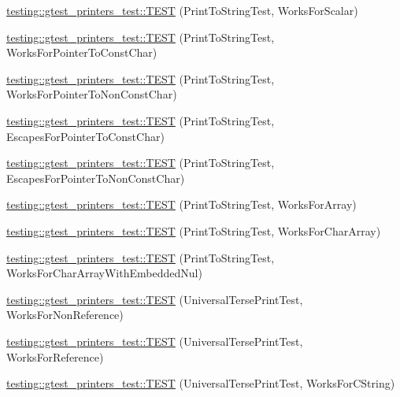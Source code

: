 \begin{DoxyCompactItemize}
\hyperlink{namespacetesting_1_1gtest__printers__test_a5d1bc4b12c18ccaec2ced9f45c092567}{testing\+::gtest\+\_\+printers\+\_\+test\+::\+T\+E\+S\+T} (Print\+To\+String\+Test, Works\+For\+Scalar)
\item 
\hyperlink{namespacetesting_1_1gtest__printers__test_a68100148758516ebab9c761ca7778586}{testing\+::gtest\+\_\+printers\+\_\+test\+::\+T\+E\+S\+T} (Print\+To\+String\+Test, Works\+For\+Pointer\+To\+Const\+Char)
\item 
\hyperlink{namespacetesting_1_1gtest__printers__test_a1db34d8760c17157572ce2877007d15a}{testing\+::gtest\+\_\+printers\+\_\+test\+::\+T\+E\+S\+T} (Print\+To\+String\+Test, Works\+For\+Pointer\+To\+Non\+Const\+Char)
\item 
\hyperlink{namespacetesting_1_1gtest__printers__test_ab8fce4287e837cfcd851ded56b62f9ce}{testing\+::gtest\+\_\+printers\+\_\+test\+::\+T\+E\+S\+T} (Print\+To\+String\+Test, Escapes\+For\+Pointer\+To\+Const\+Char)
\item 
\hyperlink{namespacetesting_1_1gtest__printers__test_a7203081ef422f0835643d2c54b8ebf28}{testing\+::gtest\+\_\+printers\+\_\+test\+::\+T\+E\+S\+T} (Print\+To\+String\+Test, Escapes\+For\+Pointer\+To\+Non\+Const\+Char)
\item 
\hyperlink{namespacetesting_1_1gtest__printers__test_a78bd89af8a8505880b78ec2a001d3cb8}{testing\+::gtest\+\_\+printers\+\_\+test\+::\+T\+E\+S\+T} (Print\+To\+String\+Test, Works\+For\+Array)
\item 
\hyperlink{namespacetesting_1_1gtest__printers__test_ad122dc21e7ebad023d7048ef117a1129}{testing\+::gtest\+\_\+printers\+\_\+test\+::\+T\+E\+S\+T} (Print\+To\+String\+Test, Works\+For\+Char\+Array)
\item 
\hyperlink{namespacetesting_1_1gtest__printers__test_a65e208358dddc7747f4519410c71d877}{testing\+::gtest\+\_\+printers\+\_\+test\+::\+T\+E\+S\+T} (Print\+To\+String\+Test, Works\+For\+Char\+Array\+With\+Embedded\+Nul)
\item 
\hyperlink{namespacetesting_1_1gtest__printers__test_ab49ff6527b0b01411b725fe46e1af65c}{testing\+::gtest\+\_\+printers\+\_\+test\+::\+T\+E\+S\+T} (Universal\+Terse\+Print\+Test, Works\+For\+Non\+Reference)
\item 
\hyperlink{namespacetesting_1_1gtest__printers__test_ab7adb58a0e08e0830157a5a1c7bceac5}{testing\+::gtest\+\_\+printers\+\_\+test\+::\+T\+E\+S\+T} (Universal\+Terse\+Print\+Test, Works\+For\+Reference)
\item 
\hyperlink{namespacetesting_1_1gtest__printers__test_ab11252e228a240a349d747546bc222d2}{testing\+::gtest\+\_\+printers\+\_\+test\+::\+T\+E\+S\+T} (Universal\+Terse\+Print\+Test, Works\+For\+C\+String)

\end{DoxyCompactItemize}
